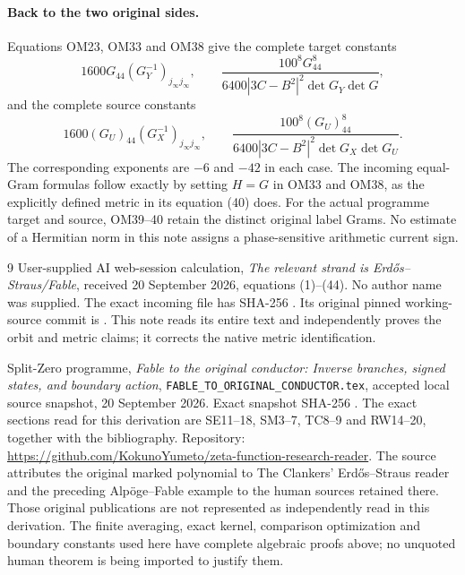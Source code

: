 \paragraph{Back to the two original sides.}
Equations OM23, OM33 and OM38 give the complete target constants
\[
1600G_{44}(G_Y^{-1})_{j_\infty j_\infty},\qquad
\frac{100^8G_{44}^8}
 {6400|3C-B^2|^2\det G_Y\det G},
\tag{OM39}
\]
and the complete source constants
\[
1600(G_U)_{44}(G_X^{-1})_{j_\infty j_\infty},\qquad
\frac{100^8(G_U)_{44}^8}
 {6400|3C-B^2|^2\det G_X\det G_U}.
\tag{OM40}
\]
The corresponding exponents are $-6$ and $-42$ in each case.
The incoming equal-Gram formulas follow exactly by setting
$H=G$ in OM33 and OM38, as the explicitly defined metric in
its equation (40) does.  For the actual programme target and
source, OM39--40 retain the distinct original label Grams.
No estimate of a Hermitian norm in this note assigns a
phase-sensitive arithmetic current sign.

\begin{thebibliography}{9}
User-supplied AI web-session calculation,
\emph{The relevant strand is Erd\H{o}s--Straus/Fable},
received 20 September 2026, equations (1)--(44).
No author name was supplied.
The exact incoming file has SHA-256
.
Its original pinned working-source commit is
.
This note reads its entire text and independently proves the
orbit and metric claims; it corrects the native metric identification.

Split-Zero programme,
\emph{Fable to the original conductor: Inverse branches, signed
states, and boundary action},
\texttt{FABLE\_TO\_ORIGINAL\_CONDUCTOR.tex},
accepted local source snapshot, 20 September 2026.
Exact snapshot SHA-256
.
The exact sections read for this derivation are SE11--18,
SM3--7, TC8--9 and RW14--20, together with the bibliography.
Repository:
\url{https://github.com/KokunoYumeto/zeta-function-research-reader}.
The source attributes the original marked polynomial to
The Clankers' Erd\H{o}s--Straus reader and the preceding
Alp\"oge--Fable example to the human sources retained there.
Those original publications are not represented as independently
read in this derivation.  The finite averaging, exact kernel,
comparison optimization and boundary constants used here have
complete algebraic proofs above; no unquoted human theorem is
being imported to justify them.
\end{thebibliography}

